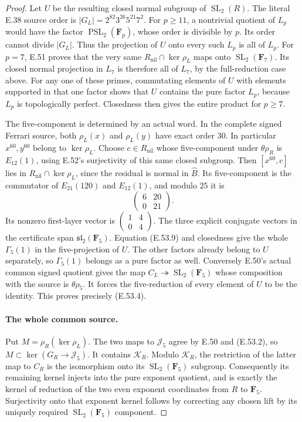 \begin{proof}
Let $U$ be the resulting closed normal subgroup
of $\operatorname{SL}_2(R)$.
The literal E.38 source order is
$|G_L|=2^{82}3^{26}5^{21}7^2$.
For $p\geq11$, a nontrivial quotient of $L_p$
would have the factor $\operatorname{PSL}_2(\mathbf F_p)$,
whose order is divisible by $p$.
Its order cannot divide $|G_L|$.
Thus the projection of $U$ onto every such $L_p$
is all of $L_p$.
For $p=7$, E.51 proves that the very same
$R_{\mathrm{nil}}\cap\ker\rho_L$ maps onto
$\operatorname{SL}_2(\mathbf F_7)$.
Its closed normal projection in $L_7$ is therefore
all of $L_7$, by the full-reduction case above.
For any one of these primes, commutating elements
of $U$ with elements supported in that one factor
shows that $U$ contains the pure factor $L_p$,
because $L_p$ is topologically perfect.
Closedness then gives the entire product for $p\geq7$.

The five-component is determined by an actual word.
In the complete signed Ferrari source, both
$\rho_L(x)$ and $\rho_L(y)$ have exact order $30$.
In particular $x^{60},y^{60}$ belong to
$\ker\rho_L$.
Choose $c\in R_{\mathrm{nil}}$ whose five-component
under $\theta\rho_R$ is $E_{12}(1)$, using E.52's
surjectivity of this same closed subgroup.
Then $[x^{60},c]$ lies in
$R_{\mathrm{nil}}\cap\ker\rho_L$, since the residual
is normal in $\widehat B$.
Its five-component is the commutator of $E_{21}(120)$
and $E_{12}(1)$, and modulo $25$ it is
\[
                  \begin{pmatrix}6&20\\0&21\end{pmatrix}.
 \tag{E.53.11}
\]
Its nonzero first-layer vector is
$\left(\begin{smallmatrix}1&4\\0&4\end{smallmatrix}\right)$.
The three explicit conjugate vectors in the
certificate span $\mathfrak{sl}_2(\mathbf F_5)$.
Equation \textup{(E.53.9)} and closedness give the
whole $\Gamma_5(1)$ in the five-projection of $U$.
The other factors already belong to $U$ separately,
so $\Gamma_5(1)$ belongs as a pure factor as well.
Conversely E.50's actual common signed quotient
gives the map $C_L\twoheadrightarrow\operatorname{SL}_2(\mathbf F_5)$
whose composition with the source is $\theta\rho_5$.
It forces the five-reduction of every element of
$U$ to be the identity.
This proves precisely \textup{(E.53.4)}.

\paragraph{The whole common source.}
Put $M=\rho_R(\ker\rho_L)$.
The two maps to $\mathcal J_5$ agree by E.50 and
\textup{(E.53.2)}, so
$M\subset\ker(G_R\to\mathcal J_5)$.
It contains $\mathcal K_R$.
Modulo $\mathcal K_R$, the restriction of the latter
map to $C_R$ is the isomorphism onto its
$\operatorname{SL}_2(\mathbf F_5)$ subgroup.
Consequently its remaining kernel injects into
the pure exponent quotient, and is exactly the
kernel of reduction of the two even exponent
coordinates from $R$ to $\mathbf F_5$.
Surjectivity onto that exponent kernel follows by
correcting any chosen lift by its uniquely required
$\operatorname{SL}_2(\mathbf F_5)$ component.


\end{proof}
